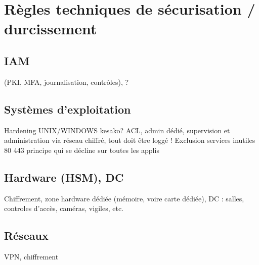 
\section{Règles techniques de sécurisation / durcissement}
\subsection{IAM} 
(PKI, MFA, journalisation, contrôles), ?
\subsection{Systèmes d'exploitation}
Hardening UNIX/WINDOWS kesako?
ACL, admin dédié, supervision et administration via réseau chiffré, tout doit être loggé ! Exclusion services inutiles
80 443 principe qui se décline sur toutes les applis
\subsection{Hardware (HSM), DC}
Chiffrement, zone hardware dédiée (mémoire, voire carte dédiée), 
DC : salles, controles d’accès, caméras, vigiles, etc.
\subsection{Réseaux}
VPN, chiffrement


